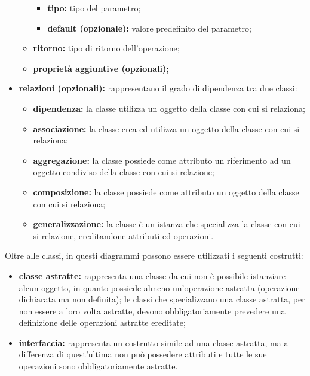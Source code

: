 \begin{itemize}[leftmargin=1.5cm]
\begin{itemize}
\begin{itemize}
									\item \textbf{tipo:} tipo del parametro;
									\item \textbf{default (opzionale):} valore predefinito del parametro;
								\end{itemize}
								\item \textbf{ritorno:} tipo di ritorno dell'operazione;
								\item \textbf{proprietà aggiuntive (opzionali);}
							\end{itemize}
							\item \textbf{relazioni (opzionali):} rappresentano il grado di dipendenza tra due classi:
							\begin{itemize}
								\item \textbf{dipendenza:} la classe utilizza un oggetto della classe con cui si relaziona;
								\item \textbf{associazione:} la classe crea ed utilizza un oggetto della classe con cui si relaziona;
								\item \textbf{aggregazione:} la classe possiede come attributo un riferimento ad un oggetto condiviso della classe con cui si relazione;
								\item \textbf{composizione:} la classe possiede come attributo un oggetto della classe con cui si relaziona;
								\item \textbf{generalizzazione:} la classe è un istanza che specializza la classe con cui si relazione, ereditandone attributi ed operazioni.
							\end{itemize}
						\end{itemize}

						\hangindent=0.6cm Oltre alle classi, in questi diagrammi possono essere utilizzati i seguenti costrutti:
						\begin{itemize}[leftmargin=1.5cm]
							\item \textbf{classe astratte:} rappresenta una classe da cui non è possibile istanziare alcun oggetto, in quanto possiede almeno un'operazione astratta (operazione dichiarata ma non definita); le classi che specializzano una classe astratta, per non essere a loro volta astratte, devono obbligatoriamente prevedere una definizione delle operazioni astratte ereditate;
							\item \textbf{interfaccia:} rappresenta un costrutto simile ad una classe astratta, ma a differenza di quest'ultima non può possedere attributi e tutte le sue operazioni sono obbligatoriamente astratte.
						\end{itemize}
						

